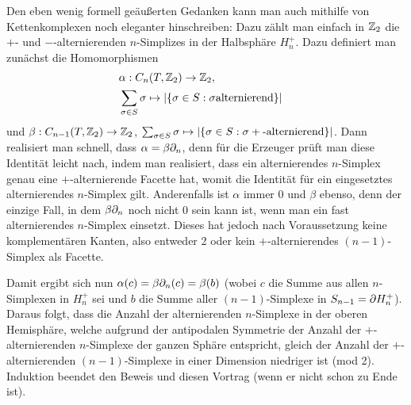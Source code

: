 \documentclass[10pt,a4paper]{article}
\begin{document}
Den eben wenig formell geäußerten Gedanken kann man auch mithilfe von Kettenkomplexen noch eleganter hinschreiben:
Dazu zählt man einfach in $\mathbb{Z}_2$ die $+$- und $-$-alternierenden $n$-Simplizes in der Halbsphäre $H^+_n$. Dazu definiert man zunächst die Homomorphismen
\begin{eqnarray*}
    & \alpha:C_n(T,\mathbb{Z}_2)\rightarrow\mathbb{Z}_2,& \\
    &\sum_{\sigma\in S}{\sigma}\mapsto\left|\{\sigma\in S:\sigma \textrm{alternierend}\}\right|&
\end{eqnarray*}
und $\beta:C_{n-1}(T,\mathbb{Z}_2)\rightarrow\mathbb{Z}_2$,  $\sum_{\sigma\in S}{\sigma}\mapsto\left|\{\sigma\in S:\sigma +\textrm{-alternierend}\}\right|$. Dann realisiert man schnell, dass $\alpha=\beta\partial_n$, denn für die Erzeuger prüft man diese Identität leicht nach, indem man realisiert, dass ein alternierendes $n$-Simplex genau eine $+$-alternierende Facette hat, womit die Identität für ein eingesetztes alternierendes $n$-Simplex gilt. Anderenfalls ist $\alpha$ immer 0 und $\beta$ ebenso, denn der einzige Fall, in dem $\beta\partial_n$ noch nicht 0 sein kann ist, wenn man ein fast alternierendes $n$-Simplex einsetzt. Dieses hat jedoch nach Voraussetzung keine komplementären Kanten, also entweder 2 oder kein $+$-alternierendes $(n-1)$-Simplex als Facette. 

Damit ergibt sich nun $\alpha(c)=\beta\partial_n(c)=\beta(b)$ (wobei $c$ die Summe aus allen $n$-Simplexen in $H^+_n$ sei und $b$ die Summe aller $(n-1)$-Simplexe in $S_{n-1}=\partial H^+_n$). Daraus folgt, dass die Anzahl der alternierenden $n$-Simplexe in der oberen Hemisphäre, welche aufgrund der antipodalen Symmetrie der Anzahl der $+$-alternierenden $n$-Simplexe der ganzen Sphäre entspricht, gleich der Anzahl der $+$-alternierenden $(n-1)$-Simplexe in einer Dimension niedriger ist (mod 2). Induktion beendet den Beweis und diesen Vortrag (wenn er nicht schon zu Ende ist).
\end{document}
